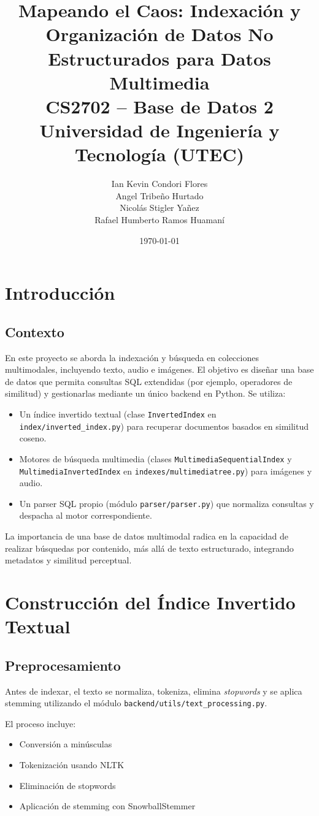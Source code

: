 \documentclass[a4paper,12pt]{report}
\title{\textbf{Mapeando el Caos: Indexación y Organización de Datos No Estructurados para Datos Multimedia}\\[1ex]
\large CS2702 – Base de Datos 2\\
\large Universidad de Ingeniería y Tecnología (UTEC)}
\author{
  Ian Kevin Condori Flores \\
  Angel Tribeño Hurtado \\
  Nicolás Stigler Yañez \\
  Rafael Humberto Ramos Huamaní \\
}
\date{\today}
\begin{document}
\maketitle
\newpage
\tableofcontents
\newpage

\chapter{Introducción}
\section{Contexto}
En este proyecto se aborda la indexación y búsqueda en colecciones multimodales, incluyendo texto, audio e imágenes. El objetivo es diseñar una base de datos que permita consultas SQL extendidas (por ejemplo, operadores de similitud) y gestionarlas mediante un único backend en Python.
Se utiliza:
\begin{itemize}
  \item Un índice invertido textual (clase \texttt{InvertedIndex} en \texttt{index/inverted\_index.py}) para recuperar documentos basados en similitud coseno.
  \item Motores de búsqueda multimedia (clases \texttt{MultimediaSequentialIndex} y \texttt{MultimediaInvertedIndex} en \texttt{indexes/multimediatree.py}) para imágenes y audio.
  \item Un parser SQL propio (módulo \texttt{parser/parser.py}) que normaliza consultas y despacha al motor correspondiente.
\end{itemize}
La importancia de una base de datos multimodal radica en la capacidad de realizar búsquedas por contenido, más allá de texto estructurado, integrando metadatos y similitud perceptual.

\chapter{Construcción del Índice Invertido Textual}
\section{Preprocesamiento}
Antes de indexar, el texto se normaliza, tokeniza, elimina \emph{stopwords} y se aplica stemming utilizando el módulo \texttt{backend/utils/text\_processing.py}.

El proceso incluye:
\begin{itemize}
\item Conversión a minúsculas
\item Tokenización usando NLTK
\item Eliminación de stopwords
\item Aplicación de stemming con SnowballStemmer
\end{itemize}
\end{document}
